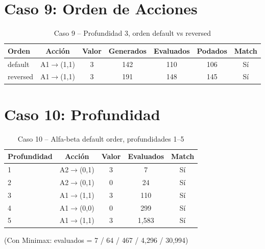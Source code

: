 \section{Caso 9: Orden de Acciones}
\label{sec:tabla-caso9}

\begin{table}[H]
\centering
\caption{Caso 9 -- Profundidad 3, orden default vs reversed}
\begin{tabular}{lcccccc}
\toprule
Orden & Acción & Valor & Generados & Evaluados & Podados & Match \\
\midrule
default & A1$\to$(1,1) & 3 & 142 & 110 & 106 & Sí \\
reversed & A1$\to$(1,1) & 3 & 191 & 148 & 145 & Sí \\
\bottomrule
\end{tabular}
\end{table}
\label{tab:caso9-full}


\section{Caso 10: Profundidad}
\label{sec:tabla-caso10}

\begin{table}[H]
\centering
\caption{Caso 10 -- Alfa-beta default order, profundidades 1--5}
\begin{tabular}{lcccc}
\toprule
Profundidad & Acción & Valor & Evaluados & Match \\
\midrule
1 & A2$\to$(0,1) & 3 & 7 & Sí \\
2 & A2$\to$(0,1) & 0 & 24 & Sí \\
3 & A1$\to$(1,1) & 3 & 110 & Sí \\
4 & A1$\to$(0,0) & 0 & 299 & Sí \\
5 & A1$\to$(1,1) & 3 & 1,583 & Sí \\
\bottomrule
\end{tabular}
\end{table}
\label{tab:caso10-full}


(Con Minimax: evaluados = 7 / 64 / 467 / 4,296 / 30,994)
